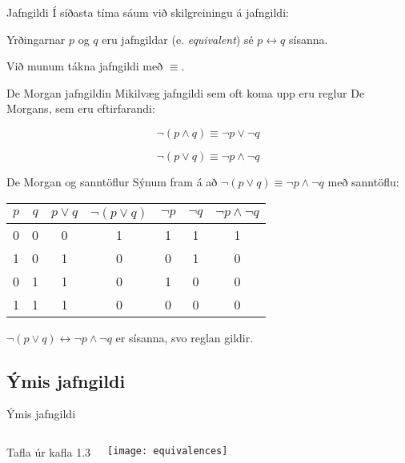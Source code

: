 \documentclass{beamer}
\begin{document}
\begin{frame}{Jafngildi}
Í síðasta tíma sáum við skilgreiningu á jafngildi:

\begin{tcolorbox}[title=Jafngildi]
Yrðingarnar $p$ og $q$ eru jafngildar (e. \emph{equivalent}) sé $p \leftrightarrow q$ sísanna.
\end{tcolorbox}

Við munum tákna jafngildi með $\equiv$.
\end{frame}

\begin{frame}{De Morgan jafngildin}
Mikilvæg jafngildi sem oft koma upp eru reglur De Morgans, sem eru eftirfarandi:

\[
 \lnot ( p \land q ) \equiv \lnot p \lor \lnot q
\]

\[
 \lnot (p \lor q ) \equiv \lnot p \land \lnot q
\]

\end{frame}

\begin{frame}{De Morgan og sanntöflur}
Sýnum fram á að $\lnot (p \lor q ) \equiv \lnot p \land \lnot q$ með sanntöflu:
\begin{center}
\begin{tabular}{ccccccc}
\toprule
$p$&$q$&$p \lor q$&$\lnot(p \lor q)$&$\lnot p$&$\lnot q$&$\lnot p \land \lnot q$\\
\midrule
0&0&0&1&1&1&1\\
1&0&1&0&0&1&0\\
0&1&1&0&1&0&0\\
1&1&1&0&0&0&0\\
\bottomrule
\end{tabular}
\end{center}
$\lnot (p \lor q ) \leftrightarrow \lnot p \land \lnot q$ er sísanna, svo reglan gildir.
\end{frame}

\subsection{Ýmis jafngildi}

\begin{frame}{Ýmis jafngildi}
\begin{columns}
Tafla úr kafla 1.3
\begin{center}
\texttt{[image: equivalences]}
\end{center}
\end{columns}
\end{frame}
\end{document}
